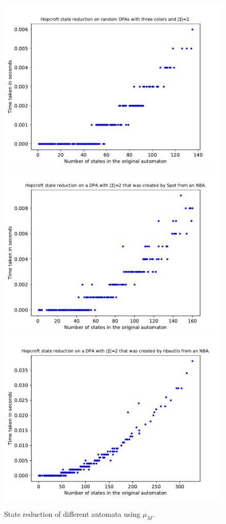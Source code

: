 \begin{figure}
\begin{minipage}{0.49\textwidth}
		\caption{State reduction of different automata using $\mu_M$.}
		\label{fig:general:empirical_moore_size_hist}
	\end{minipage}
	\hfill
	\begin{minipage}{0.49\textwidth}
		\includegraphics[page=1,height=.3\textheight]{../data/analysis/hopcroft/gendet_ap1.pdf} 
		\includegraphics[page=1,height=.3\textheight]{../data/analysis/hopcroft/detspot_ap1.pdf} 
		\includegraphics[page=1,height=.3\textheight]{../data/analysis/hopcroft/detnbaut_ap1.pdf} 

\end{minipage}
\end{figure}
